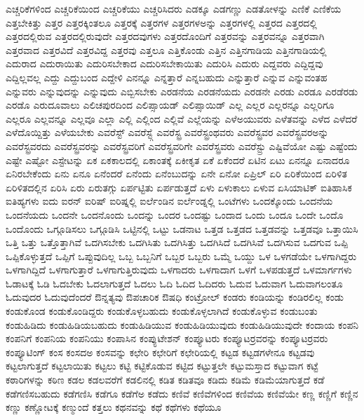 {ಎಚ್ಚರಿಕೆಗಳಿಂದ
ಎಚ್ಚರಿಕೆಯಿಂದ
ಎಚ್ಚರಿಕೆಯು
ಎಚ್ಚರಿಸಿದರು
ಎಡಕ್ಕೂ
ಎಡಗಣ್ಣು
ಎಡತೋಳನ್ನು
ಎಣಿಕೆ
ಎಣಿಕೆಯ
ಎತ್ತಬೇಕಿತ್ತು
ಎತ್ತರ
ಎತ್ತರಕ್ಕಿಂತಲೂ
ಎತ್ತರಕ್ಕೆ
ಎತ್ತರಗಳ
ಎತ್ತರಗಳಅನ್ನು
ಎತ್ತರಗಳಲ್ಲಿ
ಎತ್ತರದ
ಎತ್ತರದಲ್ಲಿ
ಎತ್ತರದಲ್ಲಿರುವ
ಎತ್ತರದಲ್ಲಿರುವುದೇ
ಎತ್ತರದವುಗಳು
ಎತ್ತರದೊಂದಿಗೆ
ಎತ್ತರವನ್ನು
ಎತ್ತರವನ್ನೂ
ಎತ್ತರವಾಗಿ
ಎತ್ತರವಾದ
ಎತ್ತರವಿದೆ
ಎತ್ತರವಿದ್ದ
ಎತ್ತರವು
ಎತ್ತಲೂ
ಎತ್ತಿಕೊಂಡು
ಎತ್ತಿನ
ಎತ್ತಿನಗಾಡಿಯ
ಎತ್ತಿನಗಾಡಿಯಲ್ಲಿ
ಎದುರಾದ
ಎದುರಾಯಿತು
ಎದುರಿಸಬೇಕಾದ
ಎದುರಿಸಬೇಕಾಯಿತು
ಎದುರಿಸಿ
ಎದುರು
ಎದ್ದವರು
ಎದ್ದಿದ್ದವು
ಎದ್ದಿಲ್ಲವಲ್ಲ
ಎದ್ದು
ಎದ್ದುಬಂದ
ಎದ್ದೇಳಿ
ಎನನ್ನೂ
ಎನ್ನತ್ತಾರೆ
ಎನ್ನಬಹುದು
ಎನ್ನುತ್ತಾರೆ
ಎನ್ನುವ
ಎನ್ನುವಂತಹ
ಎನ್ನುವರು
ಎನ್ನುವುದನ್ನು
ಎನ್ನುವುದು
ಎಬ್ಬಿಸಬೇಕು
ಎರಡನೆಯ
ಎರಡನೆಯದು
ಎರಡನೇ
ಎರಡು
ಎರಡೂ
ಎರಡೆರಡು
ಎರಡೊ
ಎರುದೂವಾಲು
ಎಲಿಚಪುರದಿಂದ
ಎಲಿಪ್ಸಾಯಡ್
ಎಲಿಪ್ಸಾಯಿಡ್
ಎಲ್ಲ
ಎಲ್ಲರ
ಎಲ್ಲರನ್ನೂ
ಎಲ್ಲರಿಗೂ
ಎಲ್ಲರೂ
ಎಲ್ಲವನ್ನೂ
ಎಲ್ಲವೂ
ಎಲ್ಲಾ
ಎಲ್ಲಿ
ಎಲ್ಲಿಂದ
ಎಲ್ಲಿವೆ
ಎಲ್ಲೆಯನ್ನು
ಎಳೆಅಯುವರು
ಎಳೆತವನ್ನು
ಎಳೆದ
ಎಳೆದರೆ
ಎಳೆದೊಯ್ದಿತ್ತು
ಎಳೆಯಬೇಕು
ಎವರೆಸ್ಟ್
ಎವರೆಸ್ಟ್ಗೆ
ಎವರೆಸ್ಟ್ರ
ಎವರೆಸ್ಟ್ರಂಥವರು
ಎವರೆಸ್ಟ್ರವರ
ಎವರೆಸ್ಟ್ರವರಅನ್ನು
ಎವರೆಸ್ಟ್ರವರದು
ಎವರೆಸ್ಟ್ರವರನ್ನು
ಎವರೆಸ್ಟ್ರವರಿಗೆ
ಎವರೆಸ್ಟ್ರವರಿಗೇ
ಎವರೆಸ್ಟ್ರವರು
ಎವರೆಸ್ಟ್ರು
ಎಷ್ಟಿವೆಯೋ
ಎಷ್ಟು
ಎಷ್ಟೆಂದು
ಎಷ್ಟೇ
ಎಷ್ಟೋ
ಎಸ್ಟೇಟನ್ನು
ಏಕ
ಏಕಕಾಲದಲ್ಲಿ
ಏಕಾಂತಕ್ಕೆ
ಏಕೀಕೃತ
ಏಕೆ
ಏಕೆಂದರೆ
ಏಟಿನ
ಏಟು
ಏನನ್ನೂ
ಏನಾದರೂ
ಏನಿರಬೇಕೆಂದು
ಏನು
ಏನೂ
ಏನೆಂದರೆ
ಏನೆಂದು
ಏನೆಂಬುದನ್ನು
ಏನೇ
ಏನೋ
ಏಪ್ರಿಲ್
ಏರಿ
ಏರಿಕೆಯಿಂದ
ಏರಿಳಿತ
ಏರಿಳಿತದಲ್ಲಿನ
ಏರಿಸಿ
ಏರು
ಏರುತಗ್ಗು
ಏರ್ಪಟ್ಟಿತು
ಏರ್ಪಡುತ್ತದೆ
ಏಳು
ಏಳುಕಾಲು
ಏಳುವ
ಏಸಿಯಾಟಿಕ್
ಐತಿಹಾಸಿಕ
ಐತಿಹ್ಯಗಳು
ಐದು
ಐರನ್
ಐರಿಷ್
ಐರಿಷ್ನಲ್ಲಿ
ಐರ್ಲೆಂಡಿನ
ಐರ್ಲೆಂಡ್ನಲ್ಲಿ
ಒಂಟೆಗಳು
ಒಂದಕ್ಕೊಂದು
ಒಂದನೆಯ
ಒಂದನೆಯದು
ಒಂದನೇ
ಒಂದನೊಂದು
ಒಂದನ್ನು
ಒಂದರ
ಒಂದಷ್ಟು
ಒಂದಾದ
ಒಂದು
ಒಂದೂ
ಒಂದೇ
ಒಂದೊ
ಒಂದೊಂದು
ಒಗ್ಗೂಡಿಸಲು
ಒಗ್ಗೂಡಿಸಿ
ಒಟ್ಟಿನಲ್ಲಿ
ಒಟ್ಟು
ಒಡನಾಟ
ಒತ್ತಡ
ಒತ್ತಡದ
ಒತ್ತಡವನ್ನು
ಒತ್ತಡವೂ
ಒತ್ತಾಯಿಸಿ
ಒತ್ತಿ
ಒತ್ತು
ಒತ್ತೊತ್ತಾಗಿವೆ
ಒದಗಿಸಬೇಕು
ಒದಗಿಸಿತು
ಒದಗಿಸಿತ್ತು
ಒದಗಿಸಿದೆ
ಒದಗಿಸಿವೆ
ಒದಗಿಸುವ
ಒದಗುವ
ಒಪ್ಪಿ
ಒಪ್ಪಿಕೊಳ್ಳುತ್ತದೆ
ಒಪ್ಪಿಗೆ
ಒಪ್ಪುವುದಿಲ್ಲ
ಒಬ್ಬ
ಒಬ್ಬನಿಗೆ
ಒಬ್ಬರ
ಒಬ್ಬರು
ಒಮ್ಮೆ
ಒಯ್ದು
ಒಳ
ಒಳಗಡೆಯೇ
ಒಳಗಾಗಿದ್ದರು
ಒಳಗಾಗಿದ್ದಿದೆ
ಒಳಗಾಗುತ್ತಾರೆ
ಒಳಗಾಗುತ್ತಿರುವುದು
ಒಳಗಾದರು
ಒಳಗಾದಾಗ
ಒಳಗೆ
ಒಳಪಡುತ್ತದೆ
ಒಳಮಾರ್ಗಗಳು
ಓಡಾಟಕ್ಕೆ
ಓಡಿ
ಓದಬೇಕು
ಓದಲಾಗುತ್ತದೆ
ಓದಲು
ಓದಿ
ಓದಿದ
ಓದಿದರು
ಓದುವ
ಓದುವಾಗ
ಓದುವಾಗಲಂತೂ
ಓದುವುದರ
ಓದುವುದೆಂದರೆ
ಔನ್ನತ್ಯವು
ಔಪಚಾರಿಕ
ಔಷಧಿ
ಕಂಟ್ರೋಲ್
ಕಂಡರು
ಕಂಡಿಯನ್ನು
ಕಂಡಿರಲಿಲ್ಲ
ಕಂಡು
ಕಂಡುಕೊಂಡ
ಕಂಡುಕೊಂಡಿದ್ದರು
ಕಂಡುಕೊಳ್ಳಬಹುದು
ಕಂಡುಕೊಳ್ಳಲಾಗಿದೆ
ಕಂಡುಕೊಳ್ಳುವ
ಕಂಡುಬಂತು
ಕಂಡುಹಿಡಿದು
ಕಂಡುಹಿಡಿಯಬಹುದು
ಕಂಡುಹಿಡಿಯುವ
ಕಂಡುಹಿಡಿಯುವುದು
ಕಂಡುಹಿಡಿಯುವುದೇ
ಕಂದಾಯ
ಕಂಪನಿ
ಕಂಪನಿಗೆ
ಕಂಪನಿಯ
ಕಂಪನಿಯು
ಕಂಪಾಸಿನ
ಕಂಪ್ಯುಟೇಶನ್
ಕಂಪ್ಯೂಟರು
ಕಂಪ್ಯೂಟರ್ರವರನ್ನು
ಕಂಪ್ಯೂಟರ್ರವರು
ಕಂಪ್ಯೂಟಿಂಗ್
ಕಂಸ
ಕಂಸದಅ
ಕಂಸವನ್ನು
ಕಛೇರಿ
ಕಛೇರಿಗೆ
ಕಛೇರಿಯಲ್ಲಿ
ಕಟ್ಟಡ
ಕಟ್ಟಡಗಳೇನೂ
ಕಟ್ಟಡವು
ಕಟ್ಟಲಾಗುತ್ತದೆ
ಕಟ್ಟಲಾಯಿತು
ಕಟ್ಟಲು
ಕಟ್ಟಿ
ಕಟ್ಟಿಕೊಡುವ
ಕಟ್ಟಿದ
ಕಟ್ಟುತ್ತಲೇ
ಕಟ್ಟುಮಸ್ತಾದ
ಕಟ್ಟುವಾಗ
ಕಟ್ಟೆ
ಕಠಾರಿಗಳನ್ನು
ಕಠಿಣ
ಕಡಲ
ಕಡಲವರೆಗೆ
ಕಡಲಿನಲ್ಲಿ
ಕಡಿತ
ಕಡಿತವೂ
ಕಡಿದು
ಕಡಿಮೆ
ಕಡಿಮೆಯಾಗುತ್ತದೆ
ಕಡೆ
ಕಡೆಗಣಿಸಬಹುದು
ಕಡೆಗಣಿಸಿ
ಕಡೆಗೂ
ಕಡೆಗೆಅ
ಕಡೆದು
ಕಣಿವೆ
ಕಣಿವೆಗಳಿಂದ
ಕಣಿವೆಯ
ಕಣಿವೆಯೇ
ಕಣ್ಣ
ಕಣ್ಣಿಗೆ
ಕಣ್ಣಿನ
ಕಣ್ಣು
ಕಣ್ಣೋಟಕ್ಕೆ
ಕಣ್ಮುಂದೆ
ಕತ್ತಲು
ಕಥನವನ್ನು
ಕಥೆ
ಕಥೆಗಳು
ಕಥೆಯೂ
}

